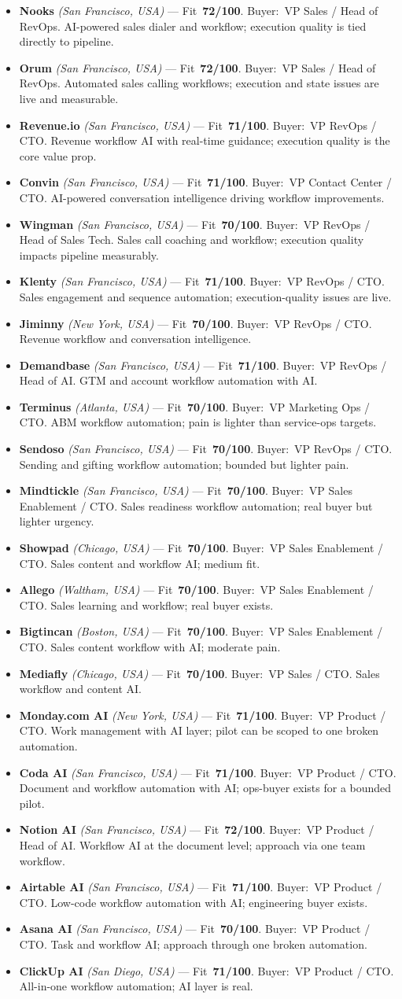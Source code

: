 \documentclass[10pt]{article}
\newcommand{\cand}[5]{\item \textbf{#1} \textit{(#2)} --- Fit~\textbf{#3/100}. Buyer:~#4. #5}
\begin{document}
\begin{itemize}
\cand{Nooks}{San Francisco, USA}{72}{VP Sales / Head of RevOps}{AI-powered sales dialer and workflow; execution quality is tied directly to pipeline.}
\cand{Orum}{San Francisco, USA}{72}{VP Sales / Head of RevOps}{Automated sales calling workflows; execution and state issues are live and measurable.}
\cand{Revenue.io}{San Francisco, USA}{71}{VP RevOps / CTO}{Revenue workflow AI with real-time guidance; execution quality is the core value prop.}
\cand{Convin}{San Francisco, USA}{71}{VP Contact Center / CTO}{AI-powered conversation intelligence driving workflow improvements.}
\cand{Wingman}{San Francisco, USA}{70}{VP RevOps / Head of Sales Tech}{Sales call coaching and workflow; execution quality impacts pipeline measurably.}
\cand{Klenty}{San Francisco, USA}{71}{VP RevOps / CTO}{Sales engagement and sequence automation; execution-quality issues are live.}
\cand{Jiminny}{New York, USA}{70}{VP RevOps / CTO}{Revenue workflow and conversation intelligence.}
\cand{Demandbase}{San Francisco, USA}{71}{VP RevOps / Head of AI}{GTM and account workflow automation with AI.}
\cand{Terminus}{Atlanta, USA}{70}{VP Marketing Ops / CTO}{ABM workflow automation; pain is lighter than service-ops targets.}
\cand{Sendoso}{San Francisco, USA}{70}{VP RevOps / CTO}{Sending and gifting workflow automation; bounded but lighter pain.}
\cand{Mindtickle}{San Francisco, USA}{70}{VP Sales Enablement / CTO}{Sales readiness workflow automation; real buyer but lighter urgency.}
\cand{Showpad}{Chicago, USA}{70}{VP Sales Enablement / CTO}{Sales content and workflow AI; medium fit.}
\cand{Allego}{Waltham, USA}{70}{VP Sales Enablement / CTO}{Sales learning and workflow; real buyer exists.}
\cand{Bigtincan}{Boston, USA}{70}{VP Sales Enablement / CTO}{Sales content workflow with AI; moderate pain.}
\cand{Mediafly}{Chicago, USA}{70}{VP Sales / CTO}{Sales workflow and content AI.}
\cand{Monday.com AI}{New York, USA}{71}{VP Product / CTO}{Work management with AI layer; pilot can be scoped to one broken automation.}
\cand{Coda AI}{San Francisco, USA}{71}{VP Product / CTO}{Document and workflow automation with AI; ops-buyer exists for a bounded pilot.}
\cand{Notion AI}{San Francisco, USA}{72}{VP Product / Head of AI}{Workflow AI at the document level; approach via one team workflow.}
\cand{Airtable AI}{San Francisco, USA}{71}{VP Product / CTO}{Low-code workflow automation with AI; engineering buyer exists.}
\cand{Asana AI}{San Francisco, USA}{70}{VP Product / CTO}{Task and workflow AI; approach through one broken automation.}
\cand{ClickUp AI}{San Diego, USA}{71}{VP Product / CTO}{All-in-one workflow automation; AI layer is real.}

\end{itemize}
\end{document}

